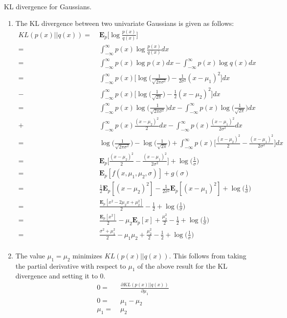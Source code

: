 \documentclass[english]{article}
\newcommand{\E}{\mathbf{E}}
\begin{document}
KL divergence for Gaussians.

  \begin{enumerate}
  \item The KL divergence between two univariate Gaussians is given as follows:
    \begin{align*}
      KL(p(x) || q(x)) =&\; \E_{p}\bigg[\log\frac{p(x)}{q(x)}\bigg] \\
      =&\; \int_{-\infty}^{\infty} p(x) \log\frac{p(x)}{q(x)} dx \\
      =&\; \int_{-\infty}^{\infty} p(x) \log{p(x)} dx - \int_{-\infty}^{\infty} p(x) \log{q(x)} dx \\
      =&\; \int_{-\infty}^{\infty} p(x)\bigg[\log\bigg(\frac{1}{\sqrt{2 \pi \sigma^2}}\bigg) - \frac{1}{2\sigma^2}(x-{\mu_{1}})^2\bigg] dx \\
      -&\;  \int_{-\infty}^{\infty} p(x)\bigg[\log\bigg(\frac{1}{\sqrt{2 \pi}}\bigg) - \frac{1}{2}(x-{\mu_{2}})^2\bigg] dx \\
      =&\; \int_{-\infty}^{\infty} p(x) \log\bigg(\frac{1}{\sqrt{2 \pi \sigma^2}}\bigg) dx - \int_{-\infty}^{\infty} p(x) \log\bigg(\frac{1}{\sqrt{2 \pi}}\bigg) dx \\
      +&\; \int_{-\infty}^{\infty} p(x) \frac{(x-{\mu_{2}})^2}{2} dx - \int_{-\infty}^{\infty} p(x)\frac{(x-{\mu_{1}})^2}{2\sigma^2} dx \\
      =&\; \log\bigg(\frac{1}{\sqrt{2 \pi \sigma^2}}\bigg) - \log\bigg(\frac{1}{\sqrt{2 \pi}}\bigg) + \int_{-\infty}^{\infty} p(x) \bigg[ \frac{(x-{\mu_{2}})^2}{2} - \frac{(x-{\mu_{1}})^2}{2\sigma^2} \bigg] dx\\
      =&\; \E_{p}\bigg[ \frac{(x-{\mu_{2}})^2}{2} - \frac{(x-{\mu_{1}})^2}{2\sigma^2} \bigg] + \log\bigg(\frac{1}{\sigma}\bigg) \\
      =&\; \mathbf{E}_p[ f(x, \mu_1, \mu_2, \sigma)] + g(\sigma) \\
      =&\; \frac{1}{2} \E_{p}[(x-{\mu_{2}})^2] - \frac{1}{2 \sigma^2} \E_{p}[(x-{\mu_{1}})^2] + \log\bigg(\frac{1}{\sigma}\bigg) \\
      =&\; \frac{\E_p[x^2-2\mu_2x+\mu_2^2]}{2} - \frac{1}{2} + \log\bigg(\frac{1}{\sigma}\bigg) \\
      =&\; \frac{\E_p[x^2]}{2} - \mu_2\E_p[x] + \frac{\mu_2^2}{2} -  \frac{1}{2} + \log\bigg(\frac{1}{\sigma}\bigg) \\
      =&\; \frac{\sigma^2 + \mu_1^2}{2} - \mu_1\mu_2 + \frac{\mu_2^2}{2} - \frac{1}{2} + \log\bigg(\frac{1}{\sigma}\bigg) \\
      \end{align*}
      
  \item The value $\mu_1 = \mu_2$ minimizes $KL(p(x)||q(x))$. This follows from taking the partial derivative with respect to $\mu_1$ of the above result for the KL divergence and setting it to $0$. 
    \begin{align*}
      0 =&\; \frac{\partial KL(p(x) || q(x))}{\partial \mu_1} \\
      0 =&\;  \mu_1 - \mu_2\\
      \mu_1 =&\; \mu_2
    \end{align*}
  \end{enumerate}
\end{document}
